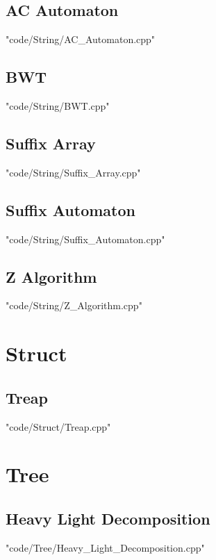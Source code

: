 \documentclass [landscape,8pt,a4paper,twocolumn]{article}
\begin{document}
\subsection{AC Automaton}
 {"code/String/AC_Automaton.cpp"}
\subsection{BWT}
 {"code/String/BWT.cpp"}
\subsection{Suffix Array}
 {"code/String/Suffix_Array.cpp"}
\subsection{Suffix Automaton}
 {"code/String/Suffix_Automaton.cpp"}
\subsection{Z Algorithm}
 {"code/String/Z_Algorithm.cpp"}
\section{Struct}
\subsection{Treap}
 {"code/Struct/Treap.cpp"}
\section{Tree}
\subsection{Heavy Light Decomposition}
 {"code/Tree/Heavy_Light_Decomposition.cpp"}
\end{document}
